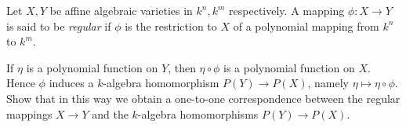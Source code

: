 \documentclass[class=book, crop=false]{standalone}
\theoremstyle{definition}
\theoremstyle{remark}
\begin{document}
\begin{enumerate}[resume*=exc1]
Let $X, Y$ be affine algebraic varieties in $k^{n}, k^{m}$ respectively. A
mapping $\phi: X \to Y$ is said to be \textit{regular} if $\phi$ is the restriction to
$X$ of a polynomial mapping from $k^{n}$ to $k^{m}$.

If $\eta$ is a polynomial function on $Y$, then $\eta \circ \phi$ is a
polynomial function on $X$. Hence $\phi$ induces a $k$-algebra homomorphism
$P(Y) \to P(X)$, namely $\eta \mapsto \eta \circ \phi$. Show that in this way we
obtain a one-to-one correspondence between the regular mappings $X \to Y$ and
the $k$-algebra homomorphisms $P(Y) \to P(X)$.
\end{enumerate}
\end{document}
